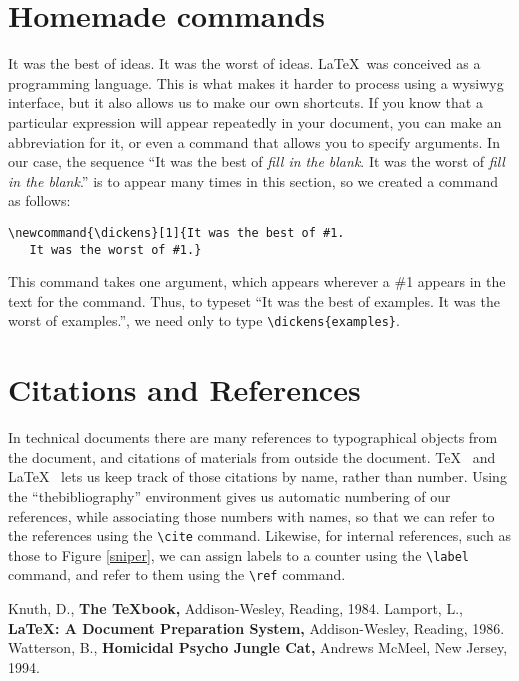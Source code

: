 \documentclass[12pt]{article}
\begin{document}
\section{Homemade commands}
\newcommand{\dickens}[1]{It was the best of #1. It was the worst of #1.}
\dickens{ideas}
\LaTeX\ was conceived as a programming language.  This is what makes it
harder to process using a wysiwyg interface, but it also allows
us to make our own shortcuts.
If you know that a particular expression will appear repeatedly
in your document, you can make an abbreviation for it, or even
a command that allows you to specify arguments.  In our case,
the sequence ``\dickens{{\it fill in the blank}}''
is to appear many times in this section, so we created a command
as follows:
\begin{verbatim}
\newcommand{\dickens}[1]{It was the best of #1. 
   It was the worst of #1.}
\end{verbatim}
This command takes one argument, which appears wherever a \#1 appears
in the text for the command.  Thus, to typeset ``\dickens{examples}'',
we need only to type \verb(\dickens{examples}(.

\section{Citations and References}
In technical documents there are many references to 
typographical objects from the document, and citations
of materials from outside the document.  \TeX\ \cite{knuth}
and \LaTeX\ \cite{lamport} lets us keep track of those citations
by name, rather than number.  Using the ``thebibliography'' 
environment gives us automatic numbering of our references,
while associating those numbers with names, so that we can
refer to the references using the \verb(\cite( command.
Likewise, for internal references, such as those to Figure \ref{sniper},
we can assign labels to a counter using the \verb(\label(
command, and refer to them using the \verb(\ref( command.

\begin{thebibliography}{X}
 Knuth, D., {\bf The \TeX book,} Addison-Wesley, Reading, 1984.
 Lamport, L., {\bf \LaTeX: A Document Preparation System,}
Addison-Wesley, Reading, 1986.
 Watterson, B., {\bf Homicidal Psycho Jungle Cat,}
Andrews McMeel, New Jersey, 1994.
\end{thebibliography}
\end{document}

